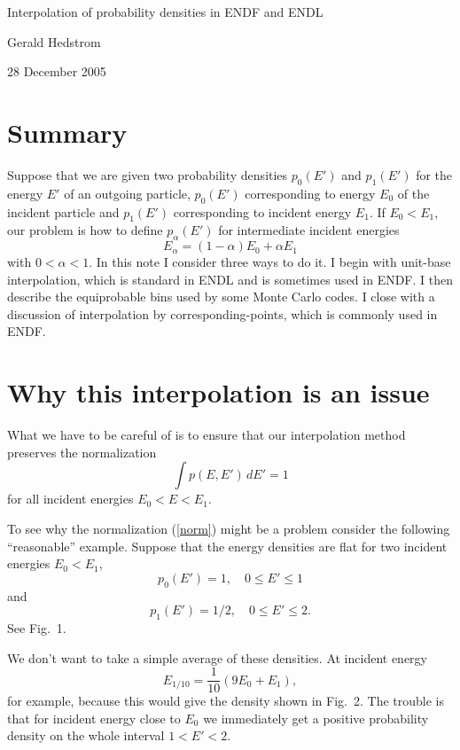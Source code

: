 \documentclass[11pt]{article}
\begin{document}
\centerline{Interpolation of probability densities in ENDF and ENDL}

\centerline{Gerald Hedstrom}

\centerline{28 December 2005}

\section{Summary}
Suppose that we are given two probability densities
$p_0(E')$ and $p_1(E')$ for the energy $E'$ of an outgoing particle,
$p_0(E')$ corresponding to energy $E_0$ of the incident particle
and $p_1(E')$ corresponding to incident energy $E_1$.
If $E_0 < E_1$, our problem is how to define $p_\alpha(E')$ for 
intermediate incident energies 
\begin{equation}
  E_\alpha = (1 - \alpha)E_0 + \alpha E_1
  \label{intermediateE}
\end{equation}
with $0 < \alpha < 1$.
In this note I consider three ways to do it.
I begin
with unit-base interpolation, which is
standard in ENDL and is sometimes used in ENDF.
I then describe the equiprobable bins used by some
Monte Carlo codes.   I close with a
discussion of
interpolation by
corresponding-points, which is commonly used in ENDF.

\section{Why this interpolation is an issue}
What we have to be careful of is to ensure that our interpolation
method preserves the normalization
\begin{equation}
  \int p(E, E') \, dE' = 1
  \label{norm}
\end{equation}
for all incident energies $E_0 < E < E_1$.

To see why the normalization (\ref{norm}) might be a problem
consider the following ``reasonable'' example.  Suppose that
the energy densities are flat for two incident energies
$E_0 < E_1$,
\[
  p_0(E') = 1, \quad 0 \le E' \le 1
\]
and
\[
  p_1(E') = 1/2, \quad 0 \le E' \le 2.
\]
See Fig.~1.

\begin{figure}

\end{figure}

We don't want to take a simple average of these densities.
At incident energy
\[
  E_{1/10} = \frac{1}{10}(9E_0 + E_1),
\]
for example, because this would give the density shown in Fig.~2.
The trouble is that for incident energy close to $E_0$ we
immediately get a positive probability density on the whole
interval $1 < E' < 2$.
\end{document}
